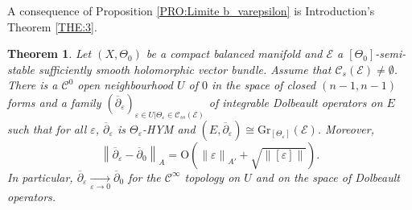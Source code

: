 \documentclass{article}
\newtheorem{theorem}{Theorem}[section]
\theoremstyle{remark}
\theoremstyle{definition}
\newcommand{\tend}[2]{\underset{#1 \rightarrow #2}{\longrightarrow}}
\newcommand{\norme}[1]{\left\| #1 \right\|}
\newcommand{\E}{\mathcal{E}}
\newcommand{\Gr}{\mathrm{Gr}}
\newcommand{\dbar}{\overline{\partial}}
\newcommand{\mC}{\mathcal{C}}
\begin{document}
A consequence of Proposition \ref{PRO:Limite b_varepsilon} is Introduction's Theorem \ref{THE:3}.
\begin{theorem}\label{THE:Famille de connections HYM}
    Let $(X,\Theta_0)$ be a compact balanced manifold and $\E$ a $[\Theta_0]$-semi-stable sufficiently smooth holomorphic vector bundle. Assume that $\mC_s(\E) \neq \emptyset$. There is a $\mC^0$ open neighbourhood $U$ of $0$ in the space of closed $(n - 1,n - 1)$ forms and a family $(\dbar_\varepsilon)_{\varepsilon \in U|\Theta_\varepsilon \in \mC_{ss}(\E)}$ of integrable Dolbeault operators on $E$ such that for all $\varepsilon$, $\dbar_\varepsilon$ is $\Theta_\varepsilon$-HYM and $(E,\dbar_\varepsilon) \cong \Gr_{[\Theta_\varepsilon]}(\E)$. Moreover,
    $$
    \norme{\dbar_\varepsilon - \dbar_0}_A = \mathrm{O}\!\left(\norme{\varepsilon}_{A'} + \sqrt{\norme{[\varepsilon]}}\right).
    $$
    In particular, $\dbar_\varepsilon \tend{\varepsilon}{0} \dbar_0$ for the $\mC^\infty$ topology on $U$ and on the space of Dolbeault operators.
\end{theorem}
\end{document}

